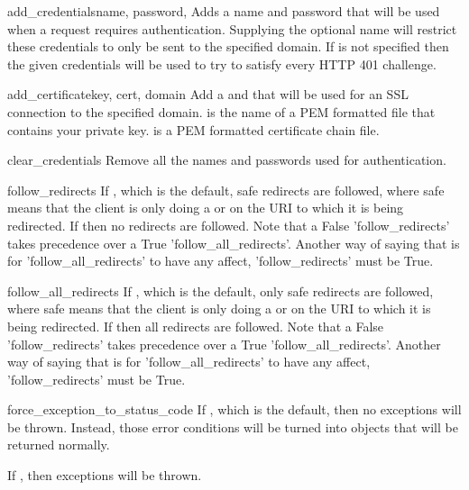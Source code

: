 \begin{methoddesc}[Http]{add_credentials}{name, password, }
Adds a name and password that will be used when a request 
requires authentication. Supplying the optional  name will
restrict these credentials to only be sent to the specified
domain. If  is not specified then the given credentials will
be used to try to satisfy every HTTP 401 challenge.
\end{methoddesc}

\begin{methoddesc}[Http]{add_certificate}{key, cert, domain}
Add a  and  that will be used for an SSL connection
to the specified domain.  is the name of a PEM formatted 
file that contains your private key.  is a PEM formatted certificate chain file. 
\end{methoddesc}

\begin{methoddesc}[Http]{clear_credentials}{}
Remove all the names and passwords used for authentication.
\end{methoddesc}

\begin{memberdesc}[Http]{follow_redirects}
If , which is the default, safe redirects are followed, where
safe means that the client is only doing a  or  on the
URI to which it is being redirected. If  then no redirects are followed.
Note that a False 'follow_redirects' takes precedence over a True 'follow_all_redirects'.
Another way of saying that is for 'follow_all_redirects' to have any affect, 'follow_redirects'
must be True.
\end{memberdesc}

\begin{memberdesc}[Http]{follow_all_redirects}
If , which is the default, only safe redirects are followed, where
safe means that the client is only doing a  or  on the
URI to which it is being redirected. If  then all redirects are followed.
Note that a False 'follow_redirects' takes precedence over a True 'follow_all_redirects'.
Another way of saying that is for 'follow_all_redirects' to have any affect, 'follow_redirects'
must be True.
\end{memberdesc}

\begin{memberdesc}[Http]{force_exception_to_status_code}
If , which is the default, then no  exceptions will be thrown. Instead,
those error conditions will be turned into  objects
that will be returned normally.

If , then exceptions will be thrown.
\end{memberdesc}

